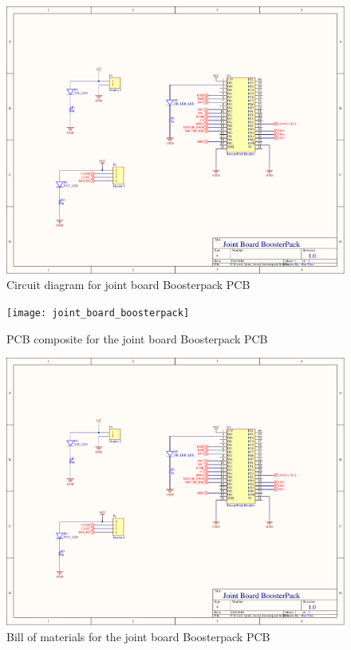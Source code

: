 \begin{figure}[H]
	\centering
	\includegraphics[page=5,scale=0.8,angle=270]{PDFs/joint_board_boosterpack.PDF}
	\caption{Circuit diagram for joint board Boosterpack PCB}
	\label{fig:joint_board_boosterpack_circuit5}
\end{figure}
\begin{figure}[H]
	\centering
	\texttt{[image: joint\_board\_boosterpack]} 
	\caption{PCB composite for the joint board Boosterpack PCB}
	\label{fig:joint_board_boosterpack_pcb}
\end{figure}
\begin{figure}[H]
	\centering
	\includegraphics[page=7,width=\textwidth]{PDFs/joint_board_boosterpack.PDF} 
	\caption{Bill of materials for the joint board Boosterpack PCB}
	\label{fig:joint_board_boosterpack_bom}
\end{figure}
